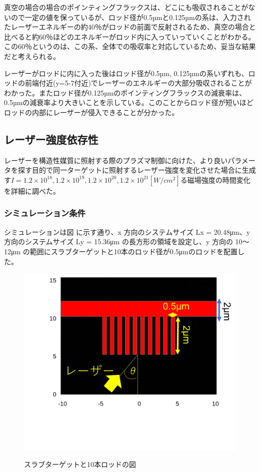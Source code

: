 \documentclass[a4paper,11pt,titlepage]{jarticle}
\numberwithin{equation}{section} %
\begin{document}
    真空の場合の場合のポインティングフラックスは、どこにも吸収されることがないので一定の値を保っているが、ロッド径が0.5µmと0.125µmの系は、入力されたレーザーエネルギーの約40％がロッドの前面で反射されるため、真空の場合と比べると約60％ほどのエネルギーがロッド内に入っていっていくことがわかる。この60％というのは、この系、全体での吸収率と対応しているため、妥当な結果だと考えられる。
    
    レーザーがロッドに内に入った後はロッド径が0.5µm, 0.125µmの系いずれも、ロッドの前端付近(y=5-7付近)でレーザーのエネルギーの大部分吸収されることがわかった。またロッド径が0.125µmのポインティングフラックスの減衰率は、0.5µmの減衰率より大きいことを示している。このことからロッド径が短いほどロッドの内部にレーザーが侵入できることが分かった。    

\subsection{レーザー強度依存性}
レーザーを構造性媒質に照射する際のプラズマ制御に向けた、より良いパラメータを探す目的で同一ターゲットに照射するレーザー強度を変化させた場合に生成す$I=1.2\times 10^{18}, 1.2\times 10^{19}, 1.2\times 10^{20}, 1.2\times 10^{21}[W/cm^2]$る磁場強度の時間変化を詳細に調べた。

\subsubsection{シミュレーション条件}
シミュレーションは図 に示す通り、x 方向のシステムサイズ Lx = 20.48μm、y 方向のシステムサイズ Ly = 15.36μm の長方形の領域を設定し、y 方向の 10～12μm の範囲にスラブターゲットと10本のロッド径が0.5μmのロッドを配置した。

\begin{figure}[H]
  \begin{center}
    \includegraphics[scale=0.4]{./image/4-9-10rod.png}
    \label{fig:4-12}
    \caption{スラブターゲットと10本ロッドの図}
  \end{center}
\end{figure}
\end{document}
